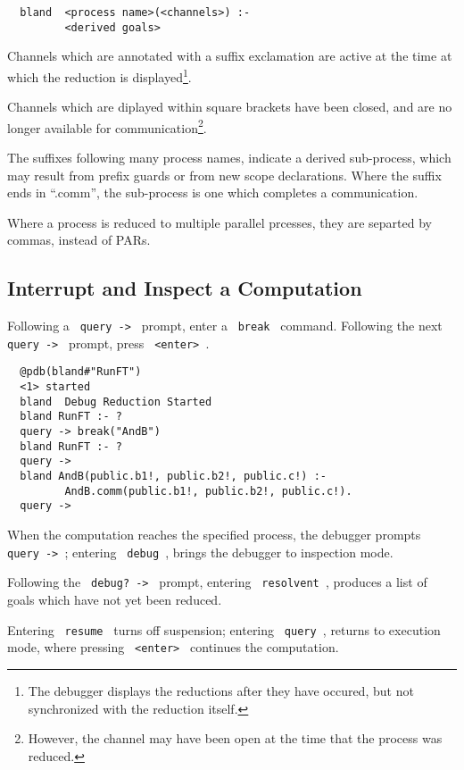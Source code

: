 \begin{verbatim}
  bland  <process name>(<channels>) :-
         <derived goals>
\end{verbatim}

\noindent
Channels which are annotated with a suffix exclamation are
active at the time at which the reduction is displayed\footnote{
The debugger displays the reductions after they have occured,
but not synchronized with the reduction itself.}.

\noindent
Channels which are diplayed within square brackets have been
closed, and are no longer available for communication\footnote{
However, the channel may have been open at the time that the
process was reduced.}.

\noindent
The suffixes following many process names, indicate a derived
sub-process, which may result from prefix guards or from new
scope declarations.  Where the suffix ends in ``.comm'', the
sub-process is one which completes a communication.

\noindent
Where a process is reduced to multiple parallel prcesses, they
are separted by commas, instead of PARs.

\subsection{Interrupt and Inspect a Computation}

Following a \verb+ query -> + prompt, enter a \verb+ break + command.
Following the next \verb+ query -> + prompt, press \verb+ <enter> +.

\begin{verbatim}
  @pdb(bland#"RunFT")
  <1> started
  bland  Debug Reduction Started
  bland RunFT :- ?
  query -> break("AndB")
  bland RunFT :- ?
  query -> 
  bland AndB(public.b1!, public.b2!, public.c!) :- 
         AndB.comm(public.b1!, public.b2!, public.c!).
  query -> 
\end{verbatim}

\noindent
When the computation reaches the specified process, the
debugger prompts \verb+ query -> +;
entering \verb+ debug +, brings the debugger
to inspection mode.

\noindent
Following the \verb+ debug? -> + prompt, entering
\verb+ resolvent +, produces a list
of goals which have not yet been reduced.

\noindent
Entering \verb+ resume + turns off suspension;
entering \verb+ query +, returns to execution
mode, where pressing \verb+ <enter> + continues the computation.

